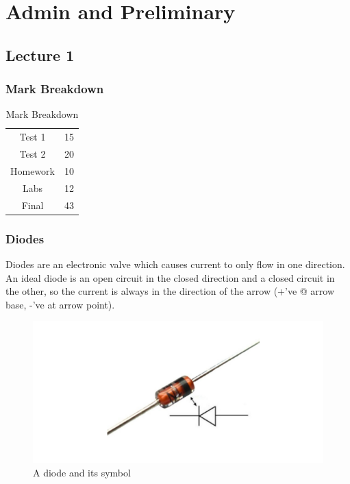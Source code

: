 \documentclass[10pt]{article}
\begin{document}

\section{Admin and Preliminary}

\subsection{Lecture 1}



\subsubsection{Mark Breakdown}

\begin{table}[H]
	\centering
	\caption{Mark Breakdown}
	\begin{tabular}{|c|c|}
		\hline
		Test 1 & 15 \\
		Test 2 & 20 \\
		Homework & 10 \\
		Labs & 12 \\
		Final & 43 \\
		\hline
	\end{tabular}
\end{table}

\subsubsection{Diodes}

Diodes are an electronic valve which causes current to only flow in one direction.
An ideal diode is an open circuit in the closed direction and a closed circuit in the other, so the current is always in the direction of the arrow (+'ve @ arrow base, -'ve at arrow point).


\begin{figure}[H]
	\centering
	\includegraphics[width=0.8\linewidth]{img/360_diode.png}
	\caption{A diode and its symbol}
	\label{fig:360:diode}
\end{figure}
\end{document}
